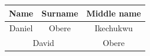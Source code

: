 \documentclass{article}
\begin{document}
	  \begin{table}[h!]
	  	\begin{center}
	  		\begin{tabular}{c|c|c}
	  			\textbf{Name} & \textbf{Surname} & \textbf{Middle name}\\
	  			\hline
	  			Daniel & Obere & Ikechukwu\\
	  			\hline
	  			\multicolumn{2}{|c|}{David} & Obere\\
	  			\hline
	  			
	  		\end{tabular}
	  	\end{center}
	  \end{table}
\end{document}
